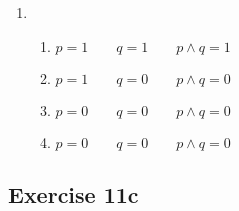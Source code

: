 \documentclass{report}
\begin{document}
\begin{enumerate}[label=\textbf{Sol.}, leftmargin=*]
    \item \begin{enumerate}[label=, leftmargin=*]
              \item $p = 1 \qquad q = 1 \qquad p \land q = 1$
              \item $p = 1 \qquad q = 0 \qquad p \land q = 0$
              \item $p = 0 \qquad q = 0 \qquad p \land q = 0$
              \item $p = 0 \qquad q = 0 \qquad p \land q = 0$
          \end{enumerate}
\end{enumerate}

\subsection*{Exercise 11c}
\end{document}
